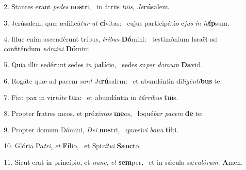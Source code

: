 2. Stantes erant \textit{pe}\textit{des} \textbf{nos}tri, \ast\  in átriis \textit{tu}\textit{is}, \textit{Je}\textbf{rú}salem.\

3. Jerúsalem, quæ ædificá\textit{tur} \textit{ut} \textbf{cí}vitas: \ast\  cujus participátio e\textit{jus} \textit{in} \textit{id}\textbf{íp}sum.\

4. Illuc enim ascendérunt tribus, \textit{tri}\textit{bus} \textbf{Dó}mini: \ast\  testimónium Israël ad confiténdum \textit{nó}\textit{mi}\textit{ni} \textbf{Dó}mini.\

5. Quia illic sedérunt sedes \textit{in} \textit{ju}\textbf{dí}cio, \ast\  sedes su\textit{per} \textit{do}\textit{mum} \textbf{Da}vid.\

6. Rogáte quæ ad pacem \textit{sunt} \textit{Je}\textbf{rú}salem: \ast\  et abundántia di\textit{li}\textit{gén}\textit{ti}\textbf{bus} te:\

7. Fiat pax in vir\textit{tú}\textit{te} \textbf{tu}a: \ast\  et abundántia in \textit{túr}\textit{ri}\textit{bus} \textbf{tu}is.\

8. Propter fratres meos, et pró\textit{xi}\textit{mos} \textbf{me}os, \ast\  loqué\textit{bar} \textit{pa}\textit{cem} \textbf{de} te:\

9. Propter domum Dómini, \textit{De}\textit{i} \textbf{nos}tri, \ast\  quæsí\textit{vi} \textit{bo}\textit{na} \textbf{ti}bi.\

10. Glória Pa\textit{tri}, \textit{et} \textbf{Fí}lio, \ast\  et Spi\textit{rí}\textit{tu}\textit{i} \textbf{Sanc}to.\

11. Sicut erat in princípio, et \textit{nunc}, \textit{et} \textbf{sem}per, \ast\  et in sǽcula sæ\textit{cu}\textit{ló}\textit{rum}. \textbf{A}men.\

